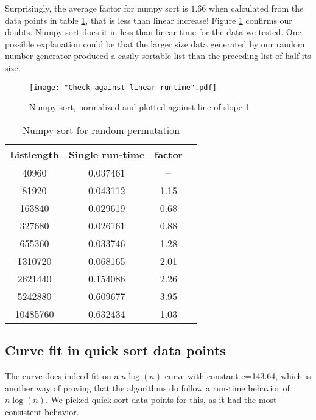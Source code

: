 \documentclass[sigconf, nonacm, natbib, screen, balance=False]{acmart}
\begin{document}
 Surprisingly, the average factor for numpy sort is $1.66$ when calculated from the data points in table \ref{tab:table3}, that is less than linear increase!  Figure \ref{fig:numpylinear} confirms our doubts. Numpy sort does it in less than linear time for the data we tested. One possible explanation could be that the larger size data generated by our random number generator produced a easily sortable list than the preceding list of half its size.

\begin{figure}[ht]
\texttt{[image: "Check against linear runtime".pdf]}
    \caption{Numpy sort, normalized and plotted against line of slope 1 }
    \label{fig:numpylinear}
\end{figure}

\begin{table}[ht]
\caption{Numpy sort for random permutation }
\label{tab:table3}
\begin{center}
\begin{tabular}{|c|c|c|c|} 
\hline
\textbf{Listlength} & 	\textbf{Single run-time} & \textbf{factor} \\ 
\hline
40960 & 	0.037461 & --	 \\ 
81920 & 	0.043112 & 	1.15 \\ 
163840 & 	0.029619 & 	0.68 \\ 
327680 & 	0.026161 & 	0.88 \\ 
655360 & 	0.033746 & 	1.28 \\ 
1310720 & 	0.068165 & 	2.01 \\ 
2621440 & 	0.154086 & 	2.26 \\ 
5242880 & 	0.609677 & 	3.95 \\ 
10485760 & 	0.632434 & 	1.03 \\ 

\hline
\end{tabular}
\end{center}
\end{table}

\subsection{Curve fit in quick sort data points}\label{sec:curveresult}
The curve does indeed fit on a $n\log(n)$ curve with constant c=143.64, which is another way of proving that the algorithms do follow a run-time behavior of $n\log(n)$. We picked quick sort data points for this, as it had the most consistent behavior.
\end{document}
